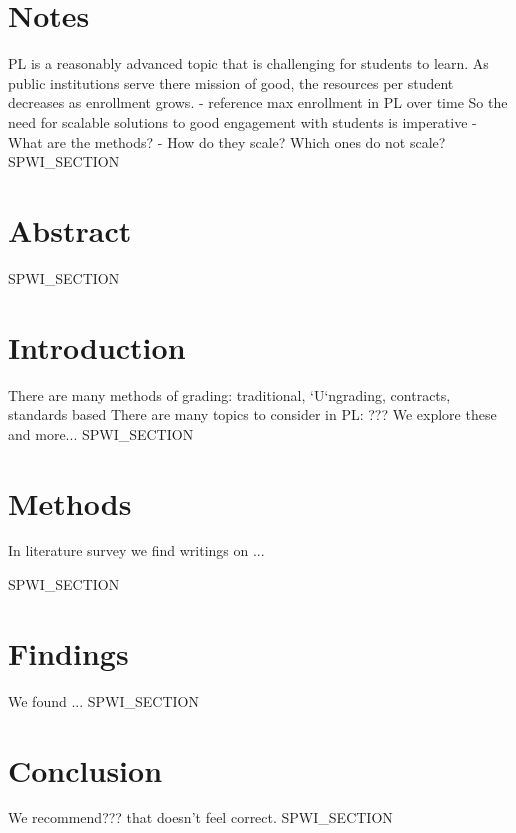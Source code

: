 
\section{Notes}
PL is a reasonably advanced topic that is challenging for students to learn.
As public institutions serve there mission of good, the resources per student decreases as enrollment grows.
- reference max enrollment in PL over time
So the need for scalable solutions to good engagement with students is imperative
- What are the methods?
- How do they scale? Which ones do not scale?
SPWI_SECTION

\section{Abstract}
SPWI_SECTION


\section{Introduction}
There are many methods of grading: traditional, `U`ngrading, contracts, standards based
There are many topics to consider in PL: ???
We explore these and more...
SPWI_SECTION


\section{Methods}
In literature survey we find writings on ...

SPWI_SECTION


\section{Findings}
We found ...
SPWI_SECTION


\section{Conclusion}
We recommend??? that doesn't feel correct.
SPWI_SECTION




